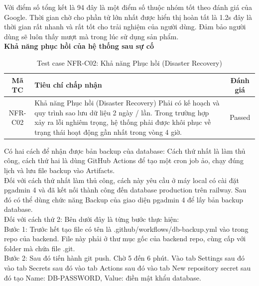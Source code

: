 Với điểm số tổng kết là 94 đây là một điểm số thuộc nhóm tốt theo đánh giá của Google. Thời gian chờ cho phần tử lớn nhất được hiển thị hoàn tất là 1.2s đây là thời gian rất nhanh và rất tốt cho trải nghiệm của người dùng. Đảm bảo người dùng sẽ luôn thấy mượt mà trong lúc sử dụng sản phẩm. \\

\vspace{0.3cm}
\noindent\textbf{Khả năng phục hồi của hệ thống sau sự cố}

\begin{table}[H]
  \centering
  \renewcommand{\arraystretch}{1.3}
  \begin{tabular}{|c|p{8.3cm}|c|}
    \hline
    \textbf{Mã TC} & \textbf{Tiêu chí chấp nhận}                                                                                                                                                                                                 & \textbf{Đánh giá} \\
    \hline
    NFR-C02        & Khả năng Phục hồi (Disaster Recovery) Phải có kế hoạch và quy trình sao lưu dữ liệu 2 ngày / lần. Trong trường hợp xảy ra lỗi nghiêm trọng, hệ thống phải được khôi phục về trạng thái hoạt động gần nhất trong vòng 4 giờ. & Passed            \\
    \hline
  \end{tabular}
  \caption{Test case NFR-C02: Khả năng Phục hồi (Disaster Recovery)}
\end{table}

Có hai cách để nhận được bản backup của database: Cách thứ nhất là làm thủ công, cách thứ hai là dùng GitHub Actions để tạo một cron job ảo, chạy đúng lịch và lưu file backup vào Artifacts. \\

Đối với cách thứ nhất làm thủ công, cách này yêu cầu ở máy local có cài đặt pgadmin 4 và đã kết nối thành công đến database production trên railway. Sau đó có thể dùng chức năng Backup của giao diện pgadmin 4 để lấy bản backup database. \\

Đối với cách thứ 2: Bên dưới đây là từng bước thực hiện: \\

Bước 1: Trước hết tạo file có tên là .github/workflows/db-backup.yml vào trong repo của backend. File này phải ở thư mục gốc của backend repo, cùng cấp với folder mà chứa file .git. \\

Bước 2: Sau đó tiến hành git push. Chờ 5 đến 6 phút. Vào tab Settings sau đó vào tab Secrets sau đó vào tab Actions sau đó vào tab New repository secret sau đó tạo Name: DB-PASSWORD, Value: điền mật khẩu database. \\

